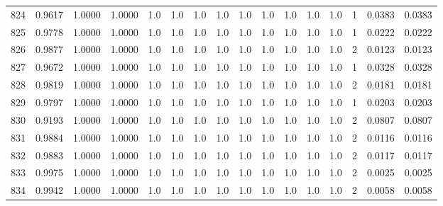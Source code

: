 \begin{tabular}{lrrrrrrrrrrrrrrr}
824 &      0.9617 &  1.0000 &  1.0000 &     1.0 &     1.0 &     1.0 &     1.0 &     1.0 &     1.0 &     1.0 &      1.0 &        1.0 &      1 &                    0.0383 &                     0.0383 \\
825 &      0.9778 &  1.0000 &  1.0000 &     1.0 &     1.0 &     1.0 &     1.0 &     1.0 &     1.0 &     1.0 &      1.0 &        1.0 &      1 &                    0.0222 &                     0.0222 \\
826 &      0.9877 &  1.0000 &  1.0000 &     1.0 &     1.0 &     1.0 &     1.0 &     1.0 &     1.0 &     1.0 &      1.0 &        1.0 &      2 &                    0.0123 &                     0.0123 \\
827 &      0.9672 &  1.0000 &  1.0000 &     1.0 &     1.0 &     1.0 &     1.0 &     1.0 &     1.0 &     1.0 &      1.0 &        1.0 &      1 &                    0.0328 &                     0.0328 \\
828 &      0.9819 &  1.0000 &  1.0000 &     1.0 &     1.0 &     1.0 &     1.0 &     1.0 &     1.0 &     1.0 &      1.0 &        1.0 &      2 &                    0.0181 &                     0.0181 \\
829 &      0.9797 &  1.0000 &  1.0000 &     1.0 &     1.0 &     1.0 &     1.0 &     1.0 &     1.0 &     1.0 &      1.0 &        1.0 &      1 &                    0.0203 &                     0.0203 \\
830 &      0.9193 &  1.0000 &  1.0000 &     1.0 &     1.0 &     1.0 &     1.0 &     1.0 &     1.0 &     1.0 &      1.0 &        1.0 &      2 &                    0.0807 &                     0.0807 \\
831 &      0.9884 &  1.0000 &  1.0000 &     1.0 &     1.0 &     1.0 &     1.0 &     1.0 &     1.0 &     1.0 &      1.0 &        1.0 &      2 &                    0.0116 &                     0.0116 \\
832 &      0.9883 &  1.0000 &  1.0000 &     1.0 &     1.0 &     1.0 &     1.0 &     1.0 &     1.0 &     1.0 &      1.0 &        1.0 &      2 &                    0.0117 &                     0.0117 \\
833 &      0.9975 &  1.0000 &  1.0000 &     1.0 &     1.0 &     1.0 &     1.0 &     1.0 &     1.0 &     1.0 &      1.0 &        1.0 &      2 &                    0.0025 &                     0.0025 \\
834 &      0.9942 &  1.0000 &  1.0000 &     1.0 &     1.0 &     1.0 &     1.0 &     1.0 &     1.0 &     1.0 &      1.0 &        1.0 &      2 &                    0.0058 &                     0.0058 \\

\end{tabular}
